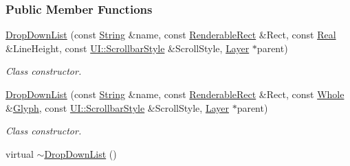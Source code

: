 \subsubsection*{Public Member Functions}
\begin{DoxyCompactItemize}
\item 
\hyperlink{classMezzanine_1_1UI_1_1DropDownList_a62db40919995b782f115b45e740eec76}{DropDownList} (const \hyperlink{namespaceMezzanine_acf9fcc130e6ebf08e3d8491aebcf1c86}{String} \&name, const \hyperlink{structMezzanine_1_1UI_1_1RenderableRect}{RenderableRect} \&Rect, const \hyperlink{namespaceMezzanine_a726731b1a7df72bf3583e4a97282c6f6}{Real} \&LineHeight, const \hyperlink{namespaceMezzanine_1_1UI_a5998a9bf372a7e92605c0c461736e763}{UI::ScrollbarStyle} \&ScrollStyle, \hyperlink{classMezzanine_1_1UI_1_1Layer}{Layer} $\ast$parent)
\begin{DoxyCompactList}\small\item\em Class constructor. \item\end{DoxyCompactList}\item 
\hyperlink{classMezzanine_1_1UI_1_1DropDownList_af9e6380b4cc92d3e30a9e3c88449be75}{DropDownList} (const \hyperlink{namespaceMezzanine_acf9fcc130e6ebf08e3d8491aebcf1c86}{String} \&name, const \hyperlink{structMezzanine_1_1UI_1_1RenderableRect}{RenderableRect} \&Rect, const \hyperlink{namespaceMezzanine_adcbb6ce6d1eb4379d109e51171e2e493}{Whole} \&\hyperlink{classMezzanine_1_1UI_1_1Glyph}{Glyph}, const \hyperlink{namespaceMezzanine_1_1UI_a5998a9bf372a7e92605c0c461736e763}{UI::ScrollbarStyle} \&ScrollStyle, \hyperlink{classMezzanine_1_1UI_1_1Layer}{Layer} $\ast$parent)
\begin{DoxyCompactList}\small\item\em Class constructor. \item\end{DoxyCompactList}\item 
\hypertarget{classMezzanine_1_1UI_1_1DropDownList_a236fbd4bb8f5f2e32653fdedceab4fb5}{
virtual \hyperlink{classMezzanine_1_1UI_1_1DropDownList_a236fbd4bb8f5f2e32653fdedceab4fb5}{$\sim$DropDownList} ()}
\label{classMezzanine_1_1UI_1_1DropDownList_a236fbd4bb8f5f2e32653fdedceab4fb5}


\end{DoxyCompactItemize}
